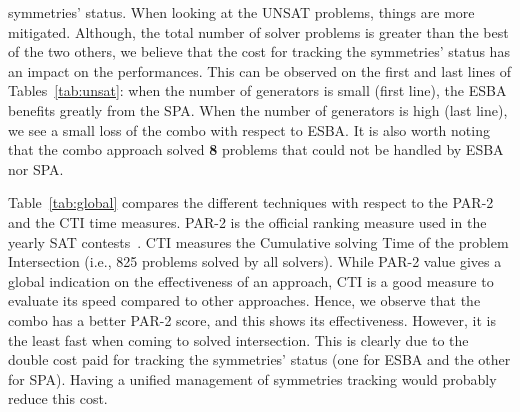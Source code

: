 symmetries’ status. When looking at the UNSAT problems, things are more
mitigated. Although, the total number of solver problems is greater than the
best of the two others, we believe that the cost for tracking the symmetries’
status has an impact on the performances. This can be observed on the first and
last lines of Tables~\ref{tab:unsat}: when the number of generators is small
(first line), the ESBA benefits greatly from the SPA. When the number of
generators is high (last line), we see a small loss of the combo with respect
to ESBA. It is also worth noting that the combo approach solved \textbf{8} problems 
that could not be handled by ESBA nor SPA.
\begin{table}[!htbp]
 \begin{center}
 \end{center}
 \caption{Comparison of PAR-2 and CTI times (in seconds) of the global solving.}
 \label{tab:global}
\end{table}
Table~\ref{tab:global} compares the different techniques with respect to the
PAR-2 and the CTI time measures. PAR-2 is the official ranking measure used in
the yearly SAT contests~\cite{jarvisalo2012international}. CTI measures the
Cumulative solving Time of the problem Intersection (i.e., 825 problems solved
by all solvers). While PAR-2 value gives a global indication on the
effectiveness of an approach, CTI is a good measure to evaluate its speed compared
to other approaches.
Hence, we observe that the combo has a better PAR-2 score, and this shows its
effectiveness. However, it is the least fast when coming to solved intersection.
This is clearly due to the double cost paid for tracking the symmetries’ status
(one for ESBA and the other for SPA). Having a unified management of
symmetries tracking would probably reduce this cost.
